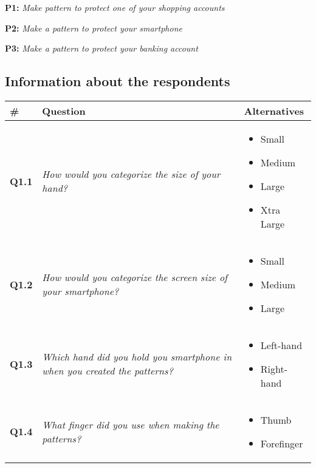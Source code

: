       {\bf P1:} {\it Make pattern to protect one of your shopping accounts}

      {\bf P2:} {\it Make a pattern to protect your smartphone}

      {\bf P3:} {\it Make a pattern to protect your banking account}

  \clearpage
    \subsection*{Information about the respondents} 

    \begin{longtable}{| p{1cm} | m{6.5cm} | m{3.5cm} |}
      \hline
      {\bf \#} & {\bf Question} & {\bf Alternatives} \\ \hline
      {\bf Q1.1} & 
      {\it How would you categorize the size of your hand?} & 
      \begin{itemize}
        \item Small
        \item Medium
        \item Large
        \item Xtra Large
      \end{itemize} 
      \\ \hline

      {\bf Q1.2} & 
      {\it How would you categorize the screen size of your smartphone?} &
      \begin{itemize}
        \item Small
        \item Medium
        \item Large
      \end{itemize} 
      \\ \hline

      {\bf Q1.3} & 
      {\it Which hand did you hold you smartphone in when you created the patterns?} & 
      \begin{itemize}
        \item Left-hand
        \item Right-hand
      \end{itemize} \\ \hline

      {\bf Q1.4} & 
      {\it What finger did you use when making the patterns?} &
      \begin{itemize}
        \item Thumb
        \item Forefinger
      \end{itemize}  \\ \hline


\end{longtable}
